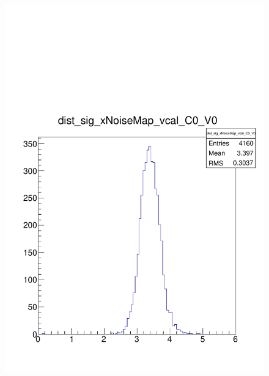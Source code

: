 \documentclass[a4paper,12pt,twoside]{article}
\begin{document}
\begin{figure} [h!]
\begin{minipage}{.48\textwidth}
  \includegraphics[width=\textwidth]{./HRSCurves_sigDist.pdf}
  \label{HRSCurves-sigDist}
\end{minipage}
\end{figure}
\end{document}
